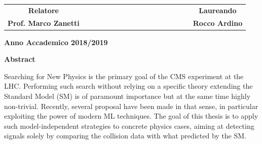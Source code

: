\begin{titlepage}
\vspace{15mm}
\begin{spacing}{2}
\begin{tabular}{ c  c  c c c  ccccccc c c c  c  c }
{\Large{\bf Relatore}} &&&&&&&&&&&&&&&& {\Large{\bf Laureando}}\\
{\Large{\bf Prof. Marco Zanetti}} &&&&&&&&&&&&&&&& {\Large{\bf Rocco Ardino}}\\
\end{tabular}
\end{spacing}
\vspace{15 mm}

\begin{center}
{\Large{\bf Anno Accademico 2018/2019}}
\end{center}
\end{titlepage}






\begin{center}
{{\large{\bf Abstract}}}
\end{center}

\begin{center}
Searching for New Physics is the primary goal of the CMS experiment at the LHC. Performing such search without relying on a
specific theory extending the Standard Model (SM) is of paramount importance but at the same time highly non-trivial. Recently,
several proposal have been made in that sense, in particular exploiting the power of modern ML techniques. The goal of this thesis is
to apply such model-independent strategies to concrete physics cases, aiming at detecting signals solely by comparing the collision
data with what predicted by the SM.
\end{center}





\clearpage{\pagestyle{empty}\cleardoublepage}
